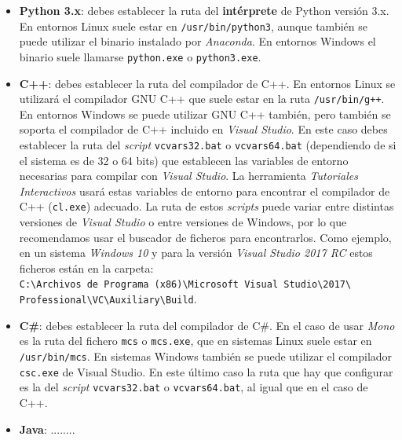 \documentclass[]{article}
\newcommand{\toolname}{\emph{Tutoriales Interactivos}}
\begin{document}
\begin{itemize}
 \item \textbf{Python 3.x}: debes establecer la ruta del \textbf{intérprete} de Python versión 3.x. En entornos Linux suele estar en \texttt{/usr/bin/python3}, aunque también se puede utilizar el binario instalado por \emph{Anaconda}. En entornos Windows el binario suele llamarse \texttt{python.exe} o \texttt{python3.exe}.
 \item \textbf{C++}: debes establecer la ruta del compilador de C++. En entornos Linux se utilizará el compilador GNU C++ que suele estar en la ruta \texttt{/usr/bin/g++}. En entornos Windows se puede utilizar GNU C++ también, pero también se soporta el compilador de C++ incluido en \emph{Visual Studio}. En este caso debes establecer la ruta del \emph{script} \texttt{vcvars32.bat} o \texttt{vcvars64.bat} (dependiendo de si el sistema es de 32 o 64 bits) que establecen las variables de entorno necesarias para compilar con \emph{Visual Studio}. La herramienta \toolname{} usará estas variables de entorno para encontrar el compilador de C++ (\texttt{cl.exe}) adecuado. La ruta de estos \emph{scripts} puede variar entre distintas versiones de \emph{Visual Studio} o entre versiones de Windows, por lo que recomendamos usar el buscador de ficheros para encontrarlos. Como ejemplo, en un sistema \emph{Windows 10} y para la versión \emph{Visual Studio 2017 RC} estos ficheros están en la carpeta: \\
 \texttt{C:\textbackslash Archivos de Programa (x86)\textbackslash Microsoft Visual Studio\textbackslash 2017\textbackslash \\
 	Professional\textbackslash VC\textbackslash Auxiliary\textbackslash Build}.
 \item \textbf{C\#}: debes establecer la ruta del compilador de C\#. En el caso de usar \emph{Mono} es la ruta del fichero \texttt{mcs} o \texttt{mcs.exe}, que en sistemas Linux suele estar en \texttt{/usr/bin/mcs}. En sistemas Windows también se puede utilizar el compilador \texttt{csc.exe} de Visual Studio. En este último caso la ruta que hay que configurar es la del \emph{script} \texttt{vcvars32.bat} o \texttt{vcvars64.bat}, al igual que en el caso de C++.
 \item \textbf{Java}: ........
\end{itemize}
\end{document}
